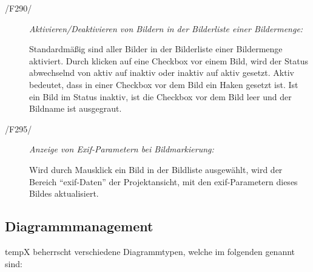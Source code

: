 \begin{description}
		\item[/F290/] \textit{Aktivieren/Deaktivieren von Bildern in der Bilderliste einer Bildermenge:}\par Standardmäßig sind aller Bilder in der Bilderliste einer Bildermenge aktiviert. Durch klicken auf eine Checkbox vor einem Bild, wird der Status abwechselnd von aktiv auf inaktiv oder inaktiv auf aktiv gesetzt. Aktiv bedeutet, dass in einer Checkbox vor dem Bild ein Haken gesetzt ist. Ist ein Bild im Status inaktiv, ist die Checkbox vor dem Bild leer und der Bildname ist ausgegraut.

		\item[/F295/] \textit{Anzeige von Exif-Parametern bei Bildmarkierung:}\par Wird durch Mausklick ein Bild in der Bildliste ausgewählt, wird der Bereich "`\gls{exif}-Daten"' der Projektansicht, mit den \gls{exif}-Parametern dieses Bildes aktualisiert.
		
	\end{description}

\subsection{Diagrammmanagement}

\label{subsec:diagrammmgmt}

	\gls{tempX} beherrscht verschiedene Diagrammtypen, welche im folgenden genannt sind:
	
